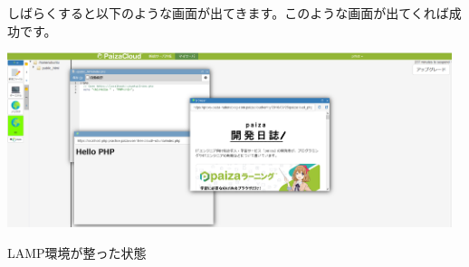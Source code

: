 しばらくすると以下のような画面が出てきます。このような画面が出てくれば成功です。

\begin{center}
\includegraphics[width=13cm]{./chap1_fig/paiza3.png}

LAMP環境が整った状態
\end{center}



